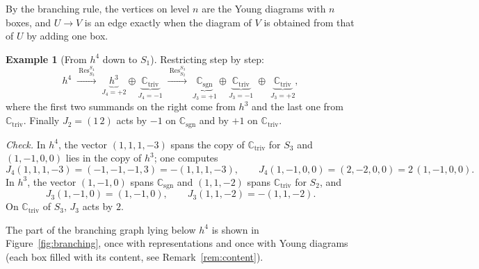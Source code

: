 \documentclass[11pt]{article}
\theoremstyle{definition}
\newtheorem{example}[theorem]{Example}
\theoremstyle{remark}
\newcommand{\C}{\mathbb{C}}
\DeclareMathOperator{\Res}{Res}
\newcommand{\Ctriv}{\C_{\mathrm{triv}}}
\newcommand{\Csgn}{\C_{\mathrm{sgn}}}
\newcommand{\h}{h}                 %
\begin{document}
By the branching rule, the vertices on level $n$ are the Young diagrams with
$n$ boxes, and $U\to V$ is an edge exactly when the diagram of $V$ is obtained
from that of $U$ by adding one box.

\begin{example}[From $\h^4$ down to $S_1$]\label{ex:h4}
Restricting step by step:
\[
  \h^4
  \;\xrightarrow{\ \Res^{S_4}_{S_3}\ }\;
  \underbrace{\h^3}_{J_4=+2}\oplus\underbrace{\Ctriv}_{J_4=-1}
  \;\xrightarrow{\ \Res^{S_3}_{S_2}\ }\;
  \underbrace{\Csgn}_{J_3=+1}\oplus\underbrace{\Ctriv}_{J_3=-1}
  \;\oplus\;\underbrace{\Ctriv}_{J_3=+2},
\]
where the first two summands on the right come from $\h^3$ and the last one
from $\Ctriv$. Finally $J_2=(1\,2)$ acts by $-1$ on $\Csgn$ and by $+1$ on
$\Ctriv$.

\smallskip
\noindent\emph{Check.} In $\h^4$, the vector $(1,1,1,-3)$ spans the copy of
$\Ctriv$ for $S_3$ and $(1,-1,0,0)$ lies in the copy of $\h^3$; one computes
\[
  J_4(1,1,1,-3)=(-1,-1,-1,3)=-(1,1,1,-3),\qquad
  J_4(1,-1,0,0)=(2,-2,0,0)=2\,(1,-1,0,0).
\]
In $\h^3$, the vector $(1,-1,0)$ spans $\Csgn$ and $(1,1,-2)$ spans $\Ctriv$
for $S_2$, and
\[
  J_3(1,-1,0)=(1,-1,0),\qquad J_3(1,1,-2)=-(1,1,-2).
\]
On $\Ctriv$ of $S_3$, $J_3$ acts by $2$.

The part of the branching graph lying below $\h^4$ is shown in
Figure~\ref{fig:branching}, once with representations and once with Young
diagrams (each box filled with its content, see
Remark~\ref{rem:content}).
\end{example}
\end{document}
